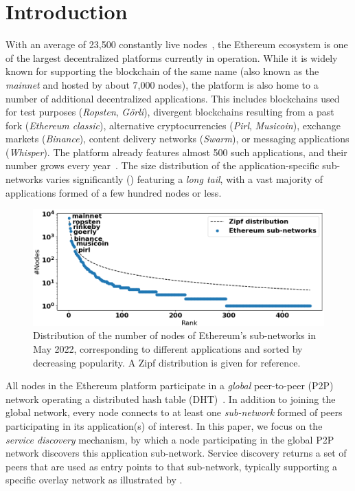 
\section{Introduction}

With an average of 23,500 constantly live nodes~\cite{discv4-dns-lists}, the Ethereum ecosystem is one of the largest decentralized platforms currently in operation.
While it is widely known for supporting the blockchain of the same name (also known as the \emph{mainnet} and hosted by about 7,000 nodes), the platform is also home to a number of additional decentralized applications.
This includes blockchains used for test purposes (\emph{Ropsten}, \emph{G\"orli}), divergent blockchains resulting from a past fork (\emph{Ethereum classic}), alternative cryptocurrencies (\emph{Pirl}, \emph{Musicoin}), exchange markets (\emph{Binance}), content delivery networks (\emph{Swarm}), or messaging applications (\emph{Whisper}).
The platform already features almost 500 such applications, and their number grows every year~\cite{discv4-dns-lists}. The size distribution of the application-specific sub-networks varies significantly () featuring a \emph{long tail}, with a vast majority of applications formed of a few hundred nodes or less.

\begin{figure}[t]
    \includegraphics[width=1\linewidth]{img/ecosystem}
    \vspace{-0.15in}
    \caption{Distribution of the number of nodes of Ethereum's sub-networks in May 2022, corresponding to different applications and sorted by decreasing popularity.
    A Zipf distribution is given for reference.
    }
    \vspace{-0.20in}
    \label{fig:ecosystem}
\end{figure}

All nodes in the Ethereum platform participate in a \emph{global} peer-to-peer (P2P) network operating a distributed hash table (DHT)~\cite{maymounkov2002kademlia}.
In addition to joining the global network, every node connects to at least one \emph{sub-network} formed of peers participating in its application(s) of interest.
In this paper, we focus on the \emph{service discovery} mechanism, by which a node participating in the global P2P network discovers this application sub-network.
Service discovery returns a set of peers that are used as entry points to that sub-network, typically supporting a specific overlay network as illustrated by .

